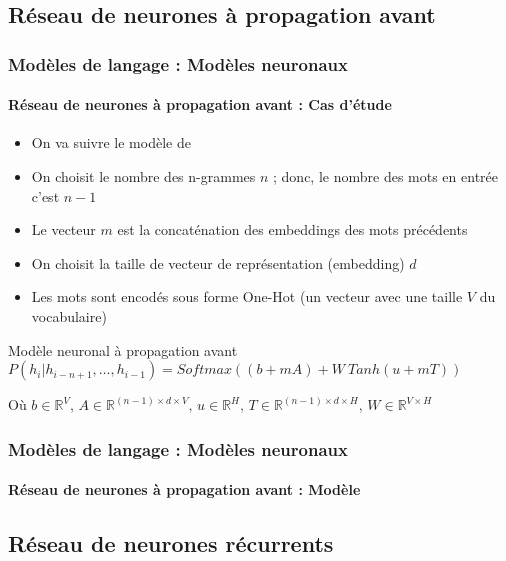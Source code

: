 \documentclass[xcolor=table]{beamer}
\begin{document}
\subsection{Réseau de neurones à propagation avant}

\begin{frame}
\frametitle{Modèles de langage : Modèles neuronaux}
\framesubtitle{Réseau de neurones à propagation avant : Cas d'étude}

\begin{itemize}
	\item On va suivre le modèle de \cite{2003-bengio-al}
	\item On choisit le nombre des n-grammes $n$ ; donc, le nombre des mots en entrée c'est $n-1$
	\item Le vecteur $m$ est la concaténation des embeddings des mots précédents
	\item On choisit la taille de vecteur de représentation (embedding) $d$
	\item Les mots sont encodés sous forme One-Hot (un vecteur avec une taille $V$ du vocabulaire)
\end{itemize}

\begin{block}{Modèle neuronal à propagation avant}
	$
	P(h_i|h_{i-n+1},\ldots, h_{i-1}) = 
	Softmax \left(
	(b + m A) 
	+ 
	W\ Tanh(u + m T)
	\right)
	$
	
	Où $b \in \mathbb{R}^{V},\, A \in \mathbb{R}^{(n-1) \times d \times V},\, u \in \mathbb{R}^{H},\, T \in \mathbb{R}^{(n-1) \times d \times H},\, W \in \mathbb{R}^{V \times H}$
\end{block}

\end{frame}

\begin{frame}
\frametitle{Modèles de langage : Modèles neuronaux}
\framesubtitle{Réseau de neurones à propagation avant : Modèle}


\end{frame}

\subsection{Réseau de neurones récurrents}
\end{document}
